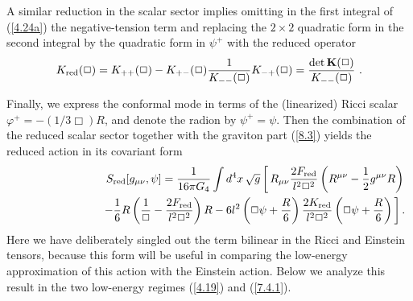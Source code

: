 \documentclass[a4paper,preprint,nofootinbib,
                 showpacs,preprintnumbers,amsmath,amssymb]{revtex4}
\begin{document}
A similar reduction in the scalar sector implies omitting in 
the first integral of (\ref{4.24a}) the negative-tension term  
and replacing the $2\times2$ quadratic form in the second integral  
by the quadratic form in $\psi^+$ with the reduced operator 
    \begin{eqnarray} 
    K_{\rm red}(\Box)=K_{++}(\Box)- 
    K_{+-}(\Box)\frac1{K_{--}(\Box)}K_{-+}(\Box) 
    =\frac{\det{\bf K}(\Box)}{K_{--}(\Box)}\ .    \label{8.8} 
    \end{eqnarray} 
 
Finally, we express the conformal mode in terms of the 
(linearized) Ricci scalar $\varphi^+=-(1/3\Box)R$, and denote the 
radion by $\psi^+=\psi$. Then the combination of the reduced scalar 
sector together with the graviton part (\ref{8.3}) yields the reduced 
action in its covariant form 
    \begin{eqnarray} 
    &&S_{\rm red}[g_{\mu\nu},\psi]=\frac1{16\pi G_4} 
    \int d^4x\,\sqrt{g}\left[\,R_{\mu\nu} 
    \frac{2F_{\rm red}}{l^2\Box^2} 
    \left(R^{\mu\nu}-\frac12 g^{\mu\nu}R\right) 
    \right.\nonumber\\ 
    &&\qquad\qquad\qquad\quad\left. 
    -\frac16R\left(\frac1\Box 
    -\frac{2F_{\rm red}}{l^2\Box^2}\right)R 
    -6l^2\left(\Box\psi+\frac R6\right) 
    \frac{2K_{\rm red}}{l^2\Box^2} 
    \left(\Box\psi+\frac R6\right)\,\right].  \label{8.9} 
    \end{eqnarray} 
Here we have deliberately singled out the term bilinear in the Ricci 
and Einstein tensors, because this form will be useful in 
comparing the low-energy approximation of this action with the 
Einstein action. Below we analyze this result in the two low-energy 
regimes (\ref{4.19}) and (\ref{7.4.1}). 
 
\end{document}
